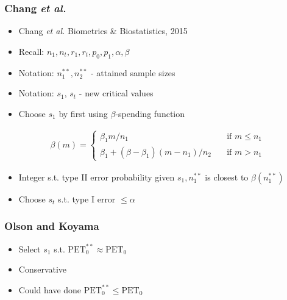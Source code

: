 \documentclass{beamer}\usepackage[]{graphicx}\usepackage[]{color}
\begin{document}
\begin{frame}
\frametitle{Chang \textit{et al.}}
    \begin{itemize}
        \item Chang \textit{et al.} Biometrics \& Biostatistics, 2015
        \item Recall: $n_1, n_t, r_1, r_t, p_0, p_1, \alpha, \beta$
        \item Notation: $n_1^{\ast\ast}, n_2^{\ast\ast}$ - attained sample sizes
        \item Notation: $s_1$, $s_t$ - new critical values
        \item Choose $s_1$ by first using $\beta$-spending function
    \end{itemize}
\begin{equation*}
\begin{aligned}
\beta(m) = \left\{
        \begin{array}{ll}
            \beta_1 m/n_1 & \quad \text{if } m\leq n_1 \\
            \beta_1 + (\beta - \beta_1)(m - n_1)/n_2 & \quad \text{if } m > n_1
        \end{array}
    \right.
\end{aligned}
\end{equation*}
  \begin{itemize}
      \item Integer s.t. type II error probability given $s_1, n_1^{\ast\ast}$ is closest to $\beta(n_1^{\ast\ast})$
      \item Choose $s_t$ s.t. type I error $\leq \alpha$
  \end{itemize}
\end{frame}

\begin{frame}
\frametitle{Olson and Koyama}
    \begin{itemize}
        \item Select $s_1$ s.t. $\mbox{PET}_0^{\ast\ast} \approx \mbox{PET}_0$ 
        \item Conservative
        \item Could have done $\mbox{PET}_0^{\ast\ast} \leq \mbox{PET}_0$ 
    \end{itemize}
\end{frame}
\end{document}
